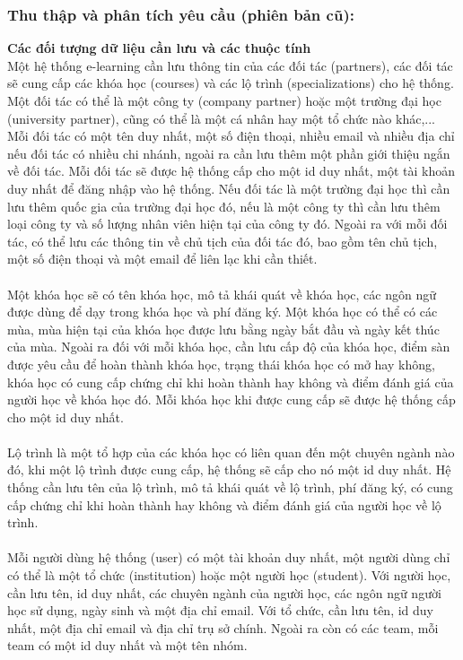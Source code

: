 \documentclass[12pt,a4paper,titlepage]{article}
\begin{document}
\subsubsection{Thu thập và phân tích yêu cầu (phiên bản cũ):}
\textbf{Các đối tượng dữ liệu cần lưu và các thuộc tính}\\
Một hệ thống e-learning cần lưu thông tin của các đối tác (partners), các đối tác sẽ cung cấp các khóa học (courses) và các lộ trình (specializations) cho hệ thống. Một đối tác có thể là một công ty (company partner) hoặc một trường đại học (university partner), cũng có thể là một cá nhân hay một tổ chức nào khác,... Mỗi đối tác có một tên duy nhất, một số điện thoại, nhiều email và nhiều địa chỉ nếu đối tác có nhiều chi nhánh, ngoài ra cần lưu thêm một phần giới thiệu ngắn về đối tác. Mỗi đối tác sẽ được hệ thống cấp cho một id duy nhất, một tài khoản duy nhất để đăng nhập vào hệ thống. Nếu đối tác là một trường đại học thì cần lưu thêm quốc gia của trường đại học đó, nếu là một công ty thì cần lưu thêm loại công ty và số lượng nhân viên hiện tại của công ty đó. Ngoài ra với mỗi đối tác, có thể lưu các thông tin về chủ tịch của đối tác đó, bao gồm tên chủ tịch, một số điện thoại và một email để liên lạc khi cần thiết.\\\\
Một khóa học sẽ có tên khóa học, mô tả khái quát về khóa học, các ngôn ngữ được dùng để dạy trong khóa học và phí đăng ký. Một khóa học có thể có các mùa, mùa hiện tại của khóa học được lưu bằng ngày bắt đầu và ngày kết thúc của mùa. Ngoài ra đối với mỗi khóa học, cần lưu cấp độ của khóa học, điểm sàn được yêu cầu để hoàn thành khóa học, trạng thái khóa học có mở hay không, khóa học có cung cấp chứng chỉ khi hoàn thành hay không và điểm đánh giá của người học về khóa học đó. Mỗi khóa học khi được cung cấp sẽ được hệ thống cấp cho một id duy nhất.\\\\
Lộ trình là một tổ hợp của các khóa học có liên quan đến một chuyên ngành nào đó, khi một lộ trình được cung cấp, hệ thống sẽ cấp cho nó một id duy nhất. Hệ thống cần lưu tên của lộ trình, mô tả khái quát về lộ trình, phí đăng ký, có cung cấp chứng chỉ khi hoàn thành hay không và điểm đánh giá của người học về lộ trình.\\\\
Mỗi người dùng hệ thống (user) có một tài khoản duy nhất, một người dùng chỉ có thể là một tổ chức (institution) hoặc một người học (student). Với người học, cần lưu tên, id duy nhất, các chuyên ngành của người học, các ngôn ngữ người học sử dụng, ngày sinh và một địa chỉ email. Với tổ chức, cần lưu tên, id duy nhất, một địa chỉ email và địa chỉ trụ sở chính. Ngoài ra còn có các team, mỗi team có một id duy nhất và một tên nhóm.\\
\end{document}
